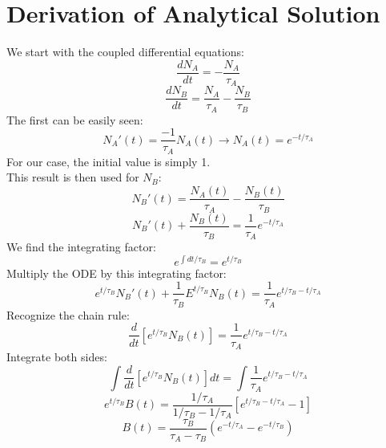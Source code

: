\documentclass{article}
\begin{document}
	\section*{Derivation of Analytical Solution}
	We start with the coupled differential equations:
	\[\frac{dN_A}{dt}=-\frac{N_A}{\tau_A}\]
	\[\frac{dN_B}{dt}=\frac{N_A}{\tau_A}-\frac{N_B}{\tau_B}\]
	The first can be easily seen:
	\[N_A'(t)=\frac{-1}{\tau_A}N_A(t)\rightarrow \boxed{N_A(t)=e^{-t/\tau_A}}\]
	For our case, the initial value is simply 1.
	\\ This result is then used for $N_B$:
	\[N_B'(t)=\frac{N_A(t)}{\tau_A}-\frac{N_B(t)}{\tau_B}\]
	\[N_B'(t)+\frac{N_B(t)}{\tau_B}=\frac{1}{\tau_A}e^{-t/\tau_A}\]
	We find the integrating factor:
	\[e^{\int{dt/\tau_B}}=e^{t/\tau_B}\]
	Multiply the ODE by this integrating factor:
	\[e^{t/\tau_B}N_B'(t)+\frac{1}{\tau_B}E^{t/\tau_B}N_B(t)=\frac{1}{\tau_A}e^{t/\tau_B-t/\tau_A}\]
	Recognize the chain rule:
	\[\frac{d}{dt}\left[e^{t/\tau_B}N_B(t)\right]=\frac{1}{\tau_A}e^{t/\tau_B-t/\tau_A}\]
	Integrate both sides:
	\[\int\frac{d}{dt}\left[e^{t/\tau_B}N_B(t)\right]dt=\int\frac{1}{\tau_A}e^{t/\tau_B-t/\tau_A}\]
	\[e^{t/\tau_B}B(t)=\dfrac{1/\tau_A}{1/\tau_B-1/\tau_A}\left[e^{t/\tau_B-t/\tau_A}-1\right]\]
	\[\boxed{B(t)=\dfrac{\tau_B}{\tau_A-\tau_B}\left(e^{-t/\tau_A}-e^{-t/\tau_B}\right)}\]
\end{document}
